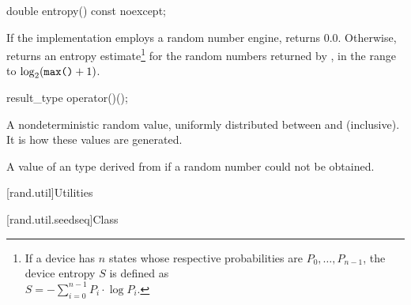 %
\begin{itemdecl}
double entropy() const noexcept;
\end{itemdecl}

\begin{itemdescr}
\pnum\returns If the implementation employs a random number engine,
 returns $0.0$.
 Otherwise, returns an entropy estimate\footnote{If a device has $n$ states
   whose respective probabilities are
   $P_0, \dotsc, P_{n-1}$,
   the device entropy $S$ is defined as\\
   $S = - \sum_{i=0}^{n-1} P_i \cdot \log P_i$.}
 for the random numbers returned by ,
 in the range
 to
   $\log_2( \texttt{max()}+1)$.
\end{itemdescr}

%
\begin{itemdecl}
result_type operator()();
\end{itemdecl}

\begin{itemdescr}
\pnum\returns A nondeterministic random value,
 uniformly distributed
 between  and  (inclusive).
 It is 
 how these values are generated.

\pnum
\throws A value of an 
 type derived from 
 if a random number could not be obtained.
\end{itemdescr}




[rand.util]{Utilities}%
%


[rand.util.seedseq]{Class }%

